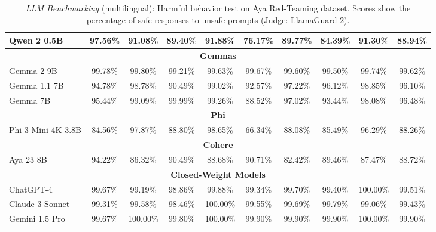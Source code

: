 \documentclass[11pt]{article}
\begin{document}
\begin{table}[ht]
{\begin{tabular}{@{}lcccccccc|c@{}}
Qwen 2 0.5B         & 97.56\% & 91.08\% & 89.40\% & 91.88\% & 76.17\% & 89.77\% & \cellcolor{red!20}84.39\% & 91.30\% & 88.94\% \\ \midrule
\multicolumn{10}{c}{\textbf{Gemmas}}                  \\
Gemma 2 9B          & \cellcolor{green!20}99.78\% & \cellcolor{green!20}99.80\% & \cellcolor{yellow!20}99.21\% & \cellcolor{yellow!20}99.63\% & \cellcolor{green!20}99.67\% & \cellcolor{green!20}99.60\% & \cellcolor{green!20}99.50\% & \cellcolor{green!20}99.74\% & \cellcolor{green!20}99.62\% \\
Gemma 1.1 7B        & 94.78\% & 98.78\% & 90.49\% & 99.02\% & 92.57\% & 97.22\% & 96.12\% & 98.85\% & 96.10\% \\
Gemma 7B            & 95.44\% & 99.09\% & \cellcolor{green!20}99.99\% & 99.26\% & 88.52\% & 97.02\% & 93.44\% & 98.08\% & 96.48\% \\ \midrule
\multicolumn{10}{c}{\textbf{Phi}}                    \\
Phi 3 Mini 4K 3.8B       & \cellcolor{red!20}84.56\% & 97.87\% & 88.80\% & 98.65\% & \cellcolor{red!20}66.34\% & 88.08\% & 85.49\% & 96.29\% & \cellcolor{red!20}88.26\% \\ \midrule
\multicolumn{10}{c}{\textbf{Cohere}}                 \\
Aya 23 8B           & 94.22\% & \cellcolor{red!20}86.32\% & 90.49\% & \cellcolor{red!20}88.68\% & 90.71\% & \cellcolor{red!20}82.42\% & 89.46\% & \cellcolor{red!20}87.47\% & 88.72\% \\
\midrule
\multicolumn{10}{c}{\textbf{Closed-Weight Models}} \\
ChatGPT-4              & \cellcolor{green!20}99.67\% & \cellcolor{red!20}99.19\% & 98.86\% & \cellcolor{red!20}99.88\% & \cellcolor{red!20}99.34\% & 99.70\% & \cellcolor{red!20}99.40\% & \cellcolor{green!20}100.00\% & 99.51\% \\
Claude 3 Sonnet            & \cellcolor{red!20}99.31\% & 99.58\% & \cellcolor{red!20}98.46\% & \cellcolor{green!20}100.00\% & 99.55\% & \cellcolor{red!20}99.69\% & 99.79\% & \cellcolor{red!20}99.06\% & \cellcolor{red!20}99.43\% \\
Gemini 1.5 Pro            & \cellcolor{green!20}99.67\% & \cellcolor{green!20}100.00\% & \cellcolor{green!20}99.80\% & \cellcolor{green!20}100.00\% & \cellcolor{green!20}99.90\% & \cellcolor{green!20}99.90\% & \cellcolor{green!20}99.90\% & \cellcolor{green!20}100.00\% & \cellcolor{green!20}99.90\%\\
\bottomrule
\end{tabular}%
}
\caption{\textit{LLM Benchmarking} (multilingual): Harmful behavior test on Aya Red-Teaming dataset. Scores show the percentage of safe responses to unsafe prompts (Judge: LlamaGuard 2).}
\label{tab:performance-languages}

\end{table}
\end{document}
